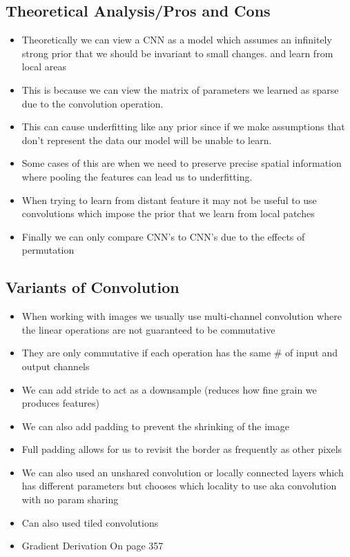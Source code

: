 \documentclass[11pt]{article}
\begin{document}
\subsection{Theoretical Analysis/Pros and Cons}
\label{sec:org97d91f6}
\begin{itemize}
\item Theoretically we can view a CNN as a model which assumes an infinitely strong prior that we should be invariant to small changes. and learn from local areas
\item This is because we can view the matrix of parameters we learned as sparse due to the convolution operation.
\item This can cause underfitting like any prior since if we make assumptions that don't represent the data our model will be unable to learn.
\item Some cases of this are when we need to preserve precise spatial information where pooling the features can lead us to underfitting.
\item When trying to learn from distant feature it may not be useful to use convolutions which impose the prior that we learn from local patches
\item Finally we can only compare CNN's to CNN's due to the effects of permutation
\end{itemize}
\subsection{Variants of Convolution}
\label{sec:org82a3e5a}
\begin{itemize}
\item When working with images we usually use multi-channel convolution where the linear operations are not guaranteed to be commutative
\item They are only commutative if each operation has the same \# of input and output channels
\item We can add stride to act as a downsample (reduces how fine grain we produces features)
\item We can also add padding to prevent the shrinking of the image
\item Full padding allows for us to revisit the border as frequently as other pixels
\item We can also used an unshared convolution or locally connected layers which has different parameters but chooses which locality to use aka convolution with no param sharing
\item Can also used tiled convolutions
\item Gradient Derivation On page 357
\end{itemize}
\end{document}

